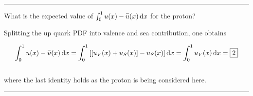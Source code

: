 \noindent\rule{7in}{1.5pt}


\begin{problem}{8.5}
    What is the expected value of $\int_0^1 u(x) - \overbar{u}(x) \dif x$ for the proton?
\end{problem}
\begin{solution}
Splitting the up quark PDF into valence and sea contribution, one obtains

    \begin{align*}
        \int_0^1 u(x) - \overbar{u}(x) \dif x =  \int_0^1 \left[ \left[ u_V(x) + u_S(x) \right] - u_S(x) \right] \dif x = \int_0^1 u_V(x) \dif x = \boxed{2} 
    \end{align*}\\
where the last identity holds as the proton is being considered here.
\end{solution}

\noindent\rule{7in}{1.5pt}


